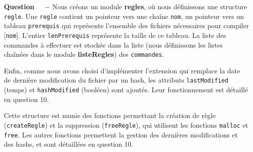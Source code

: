 \documentclass[11pt]{article}
\newcounter{question}[section]
\newenvironment{question}[1][]{\refstepcounter{question}\par\medskip
   \noindent\textbf{Question~\thequestion ~ $-$} \rmfamily}{}
\begin{document}
\begin{question} %
Nous créons un module \textbf{regles}, où nous définissons une structure \texttt{regle}. Une \texttt{regle} contient un pointeur vers une chaîne \texttt{nom}, un pointeur vers un tableau \texttt{prerequis} qui représente l'ensemble des fichiers nécessaires pour compiler [\texttt{nom}]. L'entier \texttt{lenPrerequis} représente la taille de ce tableau. La liste des commandes à effectuer est stockée dans la liste (nous définissons les listes chaînées dans le module \textbf{listeRegles}) des \texttt{commandes}.

Enfin, comme nous avons choisi d'implémenter l'extension qui remplace la date de dernière modification du fichier par un hash, les attributs \texttt{lastModified} (temps) et \texttt{hashModified} (booléen) sont ajoutés. Leur fonctionnement est détaillé en question 10.


Cette structure est munie des fonctions permettant la création de règle (\texttt{createRegle}) et la suppression (\texttt{freeRegle}), qui utilisent les fonctions \texttt{malloc} et \texttt{free}. Les autres fonctions permettent la gestion des dernières modifications et des hashs, et sont détaillées en question 10.

\end{question}
\end{document}

